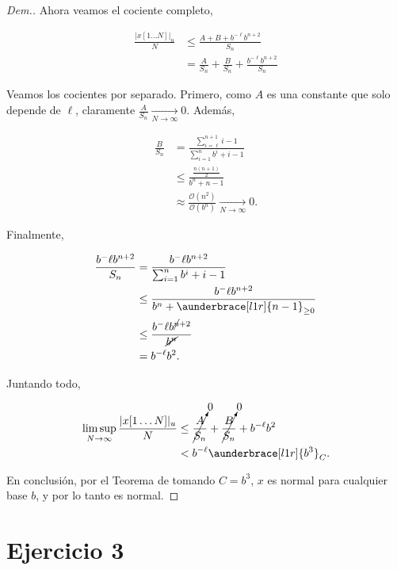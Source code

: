 \documentclass{article}
\newcommand{\BigO}{\mathcal{O}}
\theoremstyle{definition} %
\begin{document}
\begin{proof}[Dem.]
    Ahora veamos el cociente completo,

    \begin{align*}
        \frac{|x[1\dots N]|_u}{N}
            &\leq \frac{A + B + b^{-\ell} b^{n+2}}{S_n} \\
            &= \frac{A}{S_n} + \frac{B}{S_n} + \frac{ b^{-\ell} b^{n+2}}{S_n}
    \end{align*}

    Veamos los cocientes por separado. Primero, como $A$ es una constante que
    solo depende de $\ell$, claramente $\frac{A}{S_n} \xrightarrow[N \to
    \infty]{} 0$. Además,

    \begin{align*}
        \frac{B}{S_n}
            &= \frac{\sum_{i=\ell}^{n+1} i - 1}{\sum_{i=1}^{n}b^i + i - 1}\\
            &\leq \frac{\frac{n(n+1)}{2}}{b^n + n - 1}\\
            &\approx \frac{\BigO(n^2)}{\BigO(b^n)} \xrightarrow[N \to \infty]{} 0.
    \end{align*}

    Finalmente,

    \begin{align*}
        \frac{b^-\ell b^{n+2}}{S_n}
            &= \frac{b^-\ell b^{n+2}}{\sum_{i=1}^{n}b^i + i - 1} \\
            &\leq \frac{b^-\ell b^{n+2}}{b^n + \aunderbrace[l1r]{n - 1}_{\geq 0}} \\
            &\leq \frac{b^-\ell b^{\cancel{n}+2}}{\cancel{b^n}}\\
            &= b^{-\ell} b^2.
    \end{align*}

    Juntando todo,

    \begin{align*}
        \limsup_{N \to \infty} \frac{|x[1\dots N]|_u}{N}
            &\leq \cancelto{0}{\frac{A}{S_n}} + \cancelto{0}{\frac{B}{S_n}} + b^{-\ell} b^2 \\
            &< b^{-\ell}  \aunderbrace[l1r]{b^3}_{C}.
    \end{align*}

    En conclusión, por el Teorema de  tomando $C
    = b^3$, $x$ es normal para cualquier base $b$, y por lo tanto es normal.
\end{proof}

\section*{Ejercicio 3}
\end{document}
